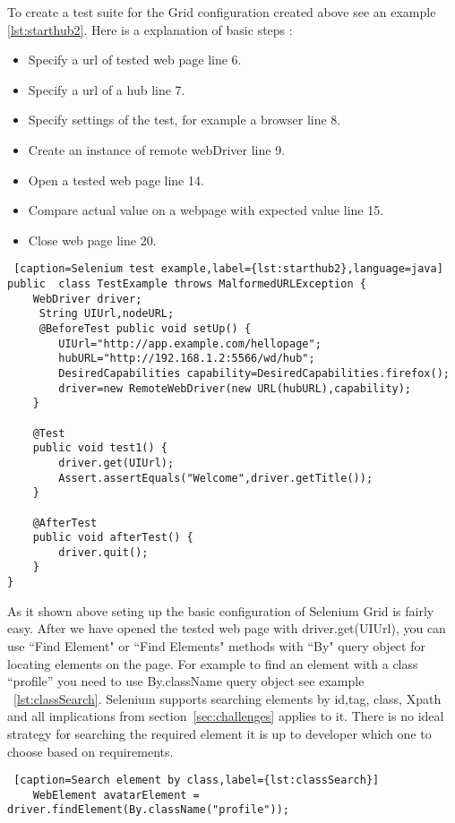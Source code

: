 	To create a test suite for the Grid configuration created above see an
	example \ref{lst:starthub2}. Here is a explanation of basic steps :
	\begin{itemize}
	  \item Specify a url of tested web page line 6.
	  \item Specify a url of a hub line 7.
	  \item Specify settings of the test, for example a browser line 8.
	  \item Create an instance of remote webDriver line 9.
	  \item Open a tested web page line 14.
	  \item Compare actual value on a webpage with expected value line 15.
	  \item Close web page line 20.
	\end{itemize}
	
	\lstset{style=a1listing}
	\begin{lstlisting} [caption=Selenium test example,label={lst:starthub2},language=java]
public 	class TestExample throws MalformedURLException {
 	WebDriver driver;
 	 String UIUrl,nodeURL;
 	 @BeforeTest public void setUp() {
 	 	UIUrl="http://app.example.com/hellopage"; 
		hubURL="http://192.168.1.2:5566/wd/hub";
		DesiredCapabilities capability=DesiredCapabilities.firefox();
		driver=new RemoteWebDriver(new URL(hubURL),capability);
	}
		
	@Test
	public void test1() {
		driver.get(UIUrl);
		Assert.assertEquals("Welcome",driver.getTitle());
	}
	
	@AfterTest
	public void afterTest() {
		driver.quit();
	}
}
	\end{lstlisting}

	As it shown above seting up the basic configuration of Selenium Grid is fairly
	easy. After we have opened the tested web page with driver.get(UIUrl), you can
	use ``Find Element" or ``Find Elements" methods with ``By" query object for
	locating elements on the page. For example to find an element with a
	class ``profile'' you need to use By.className query object see example
	~\ref{lst:classSearch}. Selenium  supports searching elements by id,tag, class,
	Xpath and all implications from section~\ref{sec:challenges} applies to it. 
	There is no ideal strategy for searching the required element it is up
	to developer which one to choose based on requirements.
	
	\lstset{style=a1listing}
	\begin{lstlisting} [caption=Search element by class,label={lst:classSearch}]
	WebElement avatarElement = driver.findElement(By.className("profile"));
	\end{lstlisting}



